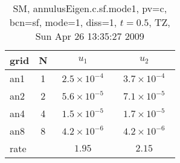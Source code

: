 \begin{table}[hbt]\tableFont %
\begin{center}
\begin{tabular}{|l|c|c|c|} \hline\hline 
grid  & N &  $u_1$ & $u_2$  \\ \hline 
                 an1 &     1 & ~$2.5\times10^{ -4}$~ & ~$3.7\times10^{ -4}$~  \\ \hline
                 an2 &     2 & ~$5.6\times10^{ -5}$~ & ~$7.1\times10^{ -5}$~  \\ \hline
                 an4 &     4 & ~$1.5\times10^{ -5}$~ & ~$1.7\times10^{ -5}$~  \\ \hline
                 an8 &     8 & ~$4.2\times10^{ -6}$~ & ~$4.2\times10^{ -6}$~  \\ \hline
    rate             &       &       $1.95$          &       $2.15$           \\ \hline\hline
\end{tabular}
\caption{SM, annulusEigen.c.sf.mode1, pv=c, bcn=sf, mode=1,  diss=1, $t=0.5$,  TZ, Sun Apr 26 13:35:27 2009}\label{table:annulusEigen.c.sf.mode1}
\end{center}
\end{table}
